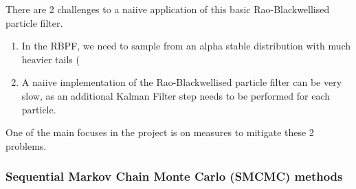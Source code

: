 \documentclass[../main.tex]{subfiles}
\begin{document}
There are 2 challenges to a naiive application of this basic Rao-Blackwellised particle filter. 

\begin{enumerate}
    \item In the RBPF, we need to sample from an alpha stable distribution with much heavier tails (
    \item A naiive implementation of the Rao-Blackwellised particle filter can be very slow, as an additional Kalman Filter step needs to be performed for each particle. 
\end{enumerate}

One of the main focuses in the project is on measures to mitigate these 2 problems.




\subsubsection{Sequential Markov Chain Monte Carlo (SMCMC) methods}
\end{document}
